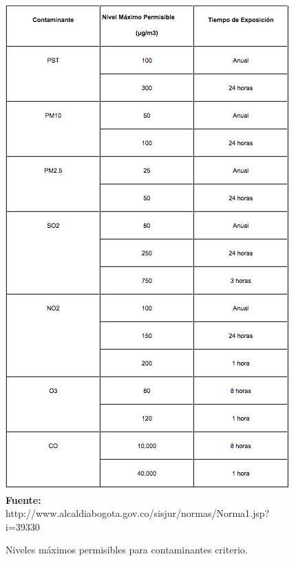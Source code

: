\documentclass[a4paper,openright,12pt]{book}
\theoremstyle{definition}
\theoremstyle{remark}
\begin{document}
\begin{figure}[h]
\centering
\caption{Niveles máximos permisibles para contaminantes criterio.} 
\includegraphics[scale=0.57]{Norma1}
\\\textbf{Fuente:} http://www.alcaldiabogota.gov.co/sisjur/normas/Norma1.jsp?i=39330
\label{fig:Ubicacion}
\end{figure}
\end{document}
